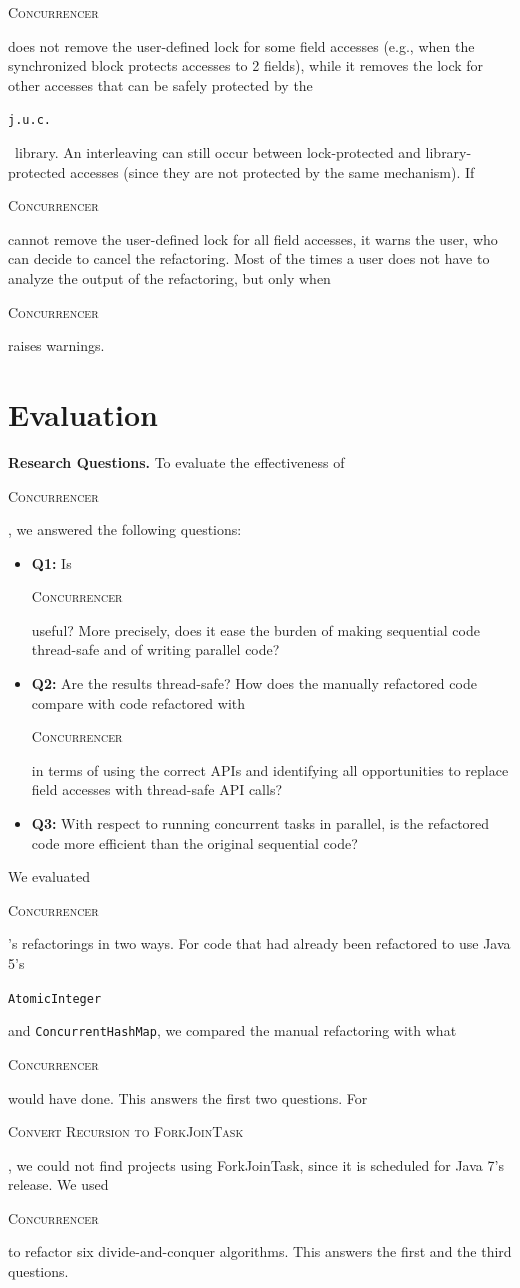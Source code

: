 \documentclass[10pt,twocolumn]{article}
\newcommand{\tool}{\begin{scriptsize}\textsc{Concurrencer}\end{scriptsize}\xspace}
\newcommand{\code}[1]{\begin{smaller}\texttt{#1}\end{smaller}}
\newcommand{\codex}[1]{{\smaller\texttt{#1}}\xspace}
\newcommand{\myParagraph}[1]{\textbf{#1}}
\newcommand{\ConvertToForkJoinTask}{{\begin{smaller}\begin{smaller}\textsc{Convert Recursion to ForkJoinTask}\end{smaller}\end{smaller}}\xspace}
\newcommand{\ConcurrentHashMap}{\codex{Con\-cur\-rent\-Hash\-Map}}
\begin{document}
\tool does not remove the user-defined lock for some
field accesses (e.g., when the synchronized block protects accesses to 2
fields), while it removes the lock for other accesses that can be
safely protected by the \code{j.u.c.}\ library. An interleaving can
still occur between lock-protected and library-protected accesses (since they
are not protected by the same mechanism). If \tool cannot remove the
user-defined lock for all field accesses, it warns the user, who can decide to
cancel the refactoring. Most of the times a user does not have to analyze the
output of the refactoring, but only when \tool raises warnings.

\section{Evaluation}\label{sec:Evaluation}

\myParagraph{Research Questions.} To evaluate the effectiveness of \tool, we 
answered the following questions:
\begin{itemize}
  \item  \textbf{Q1:} Is \tool useful? More precisely, does it ease the burden of making
  sequential code thread-safe and of writing parallel code?
  \item \textbf{Q2:} Are the results thread-safe? How does the
  manually refactored code compare with code refactored with \tool in terms of using the correct APIs
  and identifying all opportunities to replace field accesses with thread-safe
  API calls?
  \item \textbf{Q3:} With respect to running concurrent tasks in parallel, is the
  refactored code more efficient than the original sequential code?
\end{itemize}

We evaluated \tool's refactorings in two ways. For code that had already been
refactored to use Java 5's \code{AtomicInteger} and \ConcurrentHashMap, we
compared the manual refactoring with what \tool would have done. This answers
the first two questions. For \ConvertToForkJoinTask, we could not find projects
using ForkJoinTask, since it is scheduled for Java 7's release.
We used \tool to refactor six divide-and-conquer algorithms. This answers
the first and the third questions.
\end{document}
